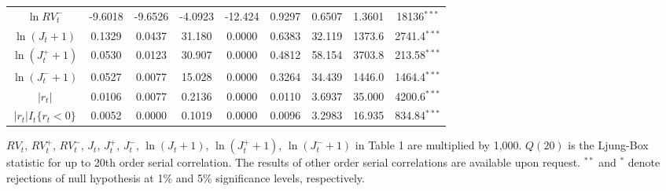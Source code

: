 \documentclass[10pt]{article}
\begin{document}
\begin{landscape}
\begin{center}
\begin{tabular}{ccccccccc}
$\ln RV_t^{-}$         &-9.6018       &-9.6526   &-4.0923        &-12.424     &0.9297               &0.6507            &1.3601          &   18136$^{\ast \ast \ast}$             \\
$\ln (J_t+1)$          &0.1329         &0.0437     &31.180         &0.0000        &0.6383               &32.119            &1373.6          &  2741.4$^{\ast \ast \ast}$            \\
$\ln (J_t^{+}+1)$      &0.0530         &0.0123     &30.907         &0.0000        &0.4812               &58.154            &3703.8          &  213.58$^{\ast \ast \ast}$            \\
$\ln (J_t^{-}+1)$     &0.0527         &0.0077     &15.028          &0.0000       &0.3264               &34.439           &1446.0          &  1464.4$^{\ast \ast \ast}$            \\
$|r_t|$                    &0.0106         &0.0077     &0.2136         &0.0000        &0.0110               &3.6937            &35.000          &  4200.6$^{\ast \ast \ast}$            \\
$|r_t|I_t{ \{r_t<0\} }$  &0.0052         &0.0000     &0.1019         &0.0000         &0.0096               &3.2983            &16.935          &  834.84$^{\ast \ast \ast}$            \\        
    \hline 
   \end{tabular}
\end{center}
$RV_t$, $RV_t^{+}$, $RV_t^{-}$, $J_t$, $J_t^{+}$, $J_t^{-}$, $\ln (J_t+1)$, $\ln (J_t^{+}+1)$, $\ln (J_t^{-}+1)$ in Table 1 are multiplied by 1,000. 
$Q(20)$ is the Ljung-Box statistic for up to 20th order serial correlation. The results of other order serial correlations are available upon request. 
$^{**}$ and $^{*}$  denote rejections of null hypothesis at 1\% and 5\% significance levels, respectively.
\end{landscape}
\end{document}
